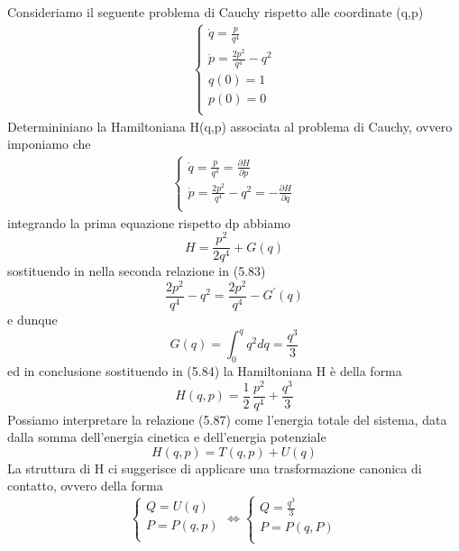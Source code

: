 Consideriamo il seguente problema di Cauchy rispetto alle coordinate (q,p)
\begin{align}
	\begin{cases}
		\dot{q} = \frac{p}{q^4}\\
		\dot{p} = \frac{2p^2}{q^4}-q^2\\
		q(0) = 1\\
		p(0) = 0 \\
	\end{cases}
\end{align}
Determininiano la Hamiltoniana H(q,p) associata al problema di Cauchy, ovvero imponiamo che 
\begin{align}
	\begin{cases}
		\dot{q} = \frac{p}{q^4} = \frac{\partial H}{\partial p}\\
		\dot{p} = \frac{2p^2}{q^4}-q^2 = -\frac{\partial H}{\partial q}\\
	\end{cases}
\end{align}
 integrando la prima equazione rispetto dp abbiamo
 \begin{equation}
 	H = \frac{p^2}{2q^4} + G(q)
 \end{equation}
 sostituendo in nella seconda relazione in (5.83)
 \begin{equation}
	\frac{2p^2}{q^4}-q^2 = \frac{2p^2}{q^4} - G^{\prime}(q)
 \end{equation}
 e dunque 
 \begin{equation}
G(q) = \int_{0}^{q} q^2dq = \frac{q^3}{3} 	
 \end{equation}
ed in conclusione sostituendo in (5.84) la Hamiltoniana H \`{e} della forma 
\begin{equation}
	H(q,p) = \frac{1}{2}\,\frac{p^2}{q^4} + \frac{q^3}{3} 
\end{equation}
Possiamo interpretare la relazione (5.87) come l'energia totale del sistema, data dalla somma dell'energia cinetica e dell'energia potenziale
\begin{equation}
	H(q,p) = T(q,p) + U(q)
\end{equation}
La struttura di H ci suggerisce di applicare una trasformazione canonica di contatto, ovvero della forma 
\begin{equation}
	\begin{cases}
		Q = U(q)\\
		P = P(q,p)\\
	\end{cases} \iff
	\begin{cases}
		Q = \frac{q^3}{3} \\
		P = P(q,P)\\
	\end{cases}
\end{equation}
